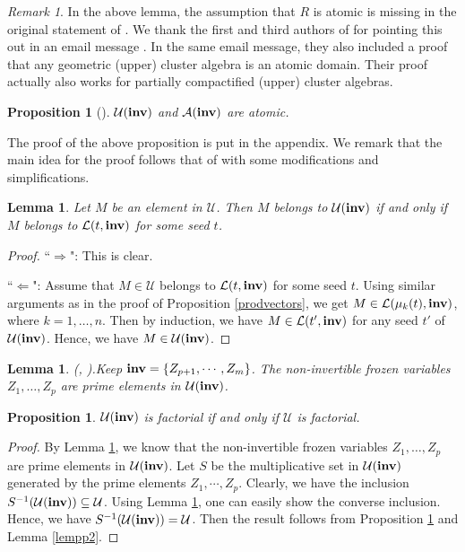 \documentclass{amsart}
\newtheorem{proposition}[theorem]{Proposition}
\newtheorem{lemma}[theorem]{Lemma}
\theoremstyle{definition}
\theoremstyle{remark}
\newtheorem{remark}[theorem]{Remark}
\numberwithin{equation}{section}
\begin{document}
\begin{remark}\label{rmk:atomic}
In the above lemma, the assumption that $R$ is atomic is missing in the original statement of \cite[Corollary 1.20]{GLS19}. We thank 
the first and third authors of \cite{GLS19} for pointing this out in an email message \cite{GS_2022}. In the same email message, they also included a proof that any geometric (upper) 
cluster algebra is an atomic domain.
Their proof actually also works for partially compactified (upper) cluster algebras.
\end{remark}

\begin{proposition}[\cite{GS_2022}]
   \label{pro:atomic}
  $\mathcal U({\bf inv})$ and $\mathcal A({\bf inv})$ are atomic.
\end{proposition}
The proof of the above proposition is put in the appendix. We remark that the main idea for the proof follows that of \cite{GS_2022} with some modifications and simplifications.



\begin{lemma}\label{lem:l-inv}
 Let $M$ be an element in $\mathcal U$. Then $M$ belongs to $\mathcal U({\bf inv})$ if and only if $M$ belongs to $\mathcal L(t,{\bf inv})$ for some seed $t$.
\end{lemma}
 \begin{proof}
 ``$\Longrightarrow$": This is clear.

 ``$\Longleftarrow$": Assume that $M\in\mathcal U$ belongs to $\mathcal L(t,{\bf inv})$ for some seed $t$.
Using similar arguments as in the proof of Proposition \ref{prodvectors}, we get $M\in \mathcal L(\mu_k(t),{\bf inv})$, where $k=1,\ldots,n$. Then by induction, we have $M\in \mathcal L(t',{\bf inv})$ for any seed $t'$ of $\mathcal U({\bf inv})$. Hence, we have $M\in\mathcal U({\bf inv})$.
 \end{proof}


 \begin{lemma}{\rm (}\cite[Lemma 7.2]{GLS19}, \cite[Proposition 4.3(i)]{MNTY-2022}{\rm ).}\label{lempp3} Keep ${\bf inv}=\{Z_{p+1},\cdots,Z_m\}$.
The non-invertible frozen variables $Z_1,\ldots,Z_p$ are prime elements in $\mathcal U({\bf inv})$.
 \end{lemma}



\begin{proposition}\label{prop:compactified_U_factoriality}
 $\mathcal U({\bf inv})$ is factorial if and only if $\mathcal U$ is factorial.
\end{proposition}
\begin{proof}
By Lemma \ref{lempp3}, we know that the non-invertible frozen variables $Z_1,\ldots,Z_p$ are prime elements in $\mathcal U({\bf inv})$.
    Let $S$ be the multiplicative set in  $\mathcal U({\bf inv})$ generated by the prime elements $Z_1,\cdots,Z_p$.
    Clearly, we have the inclusion $S^{-1}(\mathcal U({\bf inv}))\subseteq \mathcal U$. Using  Lemma \ref{lem:l-inv}, one can easily show the converse inclusion. Hence, we have  $S^{-1}(\mathcal U({\bf inv}))=\mathcal U$. Then the result follows from Proposition \ref{pro:atomic} and Lemma \ref{lempp2}. 
\end{proof}
\end{document}
